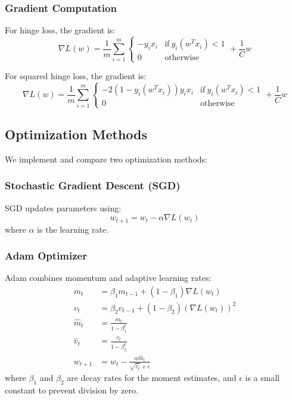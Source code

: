 \documentclass[journal, a4paper]{IEEEtran}
\begin{document}
\subsubsection{Gradient Computation}
For hinge loss, the gradient is:
\begin{equation}
\nabla L(w) = \frac{1}{m}\sum_{i=1}^{m} \begin{cases} 
-y_i x_i & \text{if}\ y_i(w^T x_i) < 1 \\
0 & \text{otherwise}
\end{cases} + \frac{1}{C}w
\end{equation}

For squared hinge loss, the gradient is:
\begin{equation}
\nabla L(w) = \frac{1}{m}\sum_{i=1}^{m} \begin{cases} 
-2(1-y_i(w^T x_i))y_i x_i & \text{if}\ y_i(w^T x_i) < 1 \\
0 & \text{otherwise}
\end{cases} + \frac{1}{C}w
\end{equation}

\subsection{Optimization Methods}
We implement and compare two optimization methods:

\subsubsection{Stochastic Gradient Descent (SGD)}
SGD updates parameters using:
\begin{equation}
w_{t+1} = w_t - \alpha \nabla L(w_t)
\end{equation}
where $\alpha$ is the learning rate.

\subsubsection{Adam Optimizer}
Adam combines momentum and adaptive learning rates:
\begin{align}
m_t &= \beta_1 m_{t-1} + (1-\beta_1) \nabla L(w_t) \\
v_t &= \beta_2 v_{t-1} + (1-\beta_2) (\nabla L(w_t))^2 \\
\hat{m}_t &= \frac{m_t}{1-\beta_1^t} \\
\hat{v}_t &= \frac{v_t}{1-\beta_2^t} \\
w_{t+1} &= w_t - \frac{\alpha \hat{m}_t}{\sqrt{\hat{v}_t} + \epsilon}
\end{align}
where $\beta_1$ and $\beta_2$ are decay rates for the moment estimates, and $\epsilon$ is a small constant to prevent division by zero.
\end{document}
